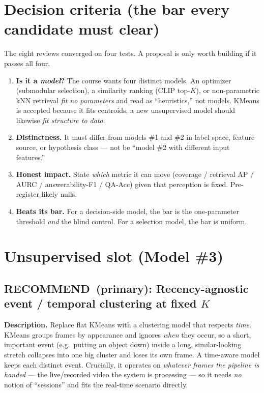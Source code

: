\documentclass[11pt]{article}
\newcommand{\rec}{\textbf{\color{hsgreen}RECOMMEND}}
\begin{document}
\section{Decision criteria (the bar every candidate must clear)}
The eight reviews converged on four tests. A proposal is only worth building if it passes all four.
\begin{enumerate}[leftmargin=1.5em,topsep=2pt,itemsep=1pt]
\item \textbf{Is it a \emph{model}?} The course wants four distinct models. An optimizer (submodular selection), a similarity ranking (CLIP top-$K$), or non-parametric kNN retrieval \emph{fit no parameters} and read as ``heuristics,'' not models. KMeans is accepted because it fits centroids; a new unsupervised model should likewise \emph{fit structure to data}.
\item \textbf{Distinctness.} It must differ from models \#1 and \#2 in label space, feature source, or hypothesis class --- not be ``model \#2 with different input features.''
\item \textbf{Honest impact.} State \emph{which} metric it can move (coverage / retrieval AP / AURC / answerability-F1 / QA-Acc) given that perception is fixed. Pre-register likely nulls.
\item \textbf{Beats its bar.} For a decision-side model, the bar is the one-parameter threshold \emph{and} the blind control. For a selection model, the bar is uniform.
\end{enumerate}

\section{Unsupervised slot (Model \#3)}

\subsection{\rec\ (primary): Recency-agnostic event / temporal clustering at fixed $K$}
\textbf{Description.} Replace flat KMeans with a clustering model that respects \emph{time}. KMeans groups frames by appearance and ignores \emph{when} they occur, so a short, important event (e.g.\ putting an object down) inside a long, similar-looking stretch collapses into one big cluster and loses its own frame. A time-aware model keeps each distinct event. Crucially, it operates on \emph{whatever frames the pipeline is handed} --- the live/recorded video the system is processing --- so it needs \emph{no} notion of ``sessions'' and fits the real-time scenario directly.
\end{document}

